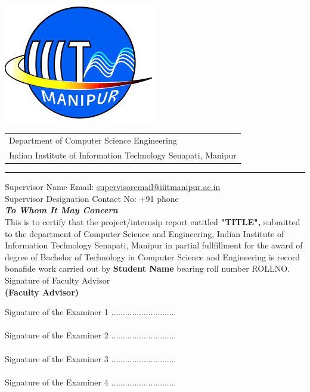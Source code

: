 \documentclass[a4paper, 11pt, oneside]{report}
\begin{document}
\begin{center}
	\thispagestyle{empty}
		
		\begin{table}
			\centering
			\includegraphics[scale=0.2]{report_file/iiit manipur.png}
			\begin{tabular}{l}
				Department of Computer Science Engineering \\
				Indian Institute of Information Technology Senapati, Manipur \\
			\end{tabular}
		\end{table}
		\par\noindent\rule{\textwidth}{0.4pt}
			Supervisor Name
			\hspace*{\fill} Email: \href{mailto:advisor@iiitmanipur.ac.in}{supervisoremail@iiitmanipur.ac.in}\\
			Supervisor Designation
			\hspace*{0pt}\hfill Contact No: +91 phone\\[2cm]
			{\Huge \textbf{\emph{To Whom It May Concern}}}\\[2cm]
			\linespread{1.13}
			\large{This is to certify that the project/internsip report 
                entitled \textbf{"TITLE",} submitted to the department of Computer Science and Engineering, Indian Institute of Information Technology Senapati, Manipur in partial fullfillment for the award of degree of Bachelor of Technology in Computer Science and Engineering is record bonafide work carried out by \textbf{Student Name} bearing roll number ROLLNO.}\\[2.0cm]
			\hspace*{2.6in}\large{Signature of Faculty Advisor}\\[0.3cm]
			\hspace*{2.5in}\textbf{(Faculty Advisor)}\\[0.5cm]
			
	\end{center}
        \vspace{0.5cm}
	Signature of the Examiner 1 ............................\\\\
	Signature of the Examiner 2 ............................\\\\
	Signature of the Examiner 3 ............................\\\\
	Signature of the Examiner 4 ............................\\\\
	\newpage
 
\end{document}
